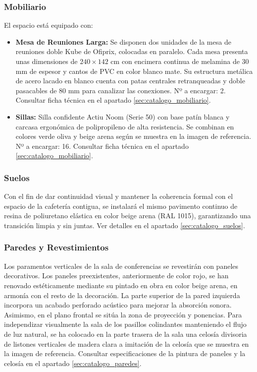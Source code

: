\documentclass[12pt,a4paper]{article}
\begin{document}
\subsubsection{Mobiliario}
El espacio está equipado con:
\begin{itemize}
    \item \textbf{Mesa de Reuniones Larga:} Se disponen dos unidades de la mesa de reuniones doble Kube de Ofiprix, colocadas en paralelo. Cada mesa presenta unas dimensiones de $240 \times 142$ cm con encimera continua de melamina de 30 mm de espesor y cantos de PVC en color blanco mate. Su estructura metálica de acero lacado en blanco cuenta con patas centrales retranqueadas y doble pasacables de 80 mm para canalizar las conexiones. Nº a encargar: 2. Consultar ficha técnica en el apartado \ref{sec:catalogo_mobiliario}.
    \item \textbf{Sillas:} Silla confidente Actiu Noom (Serie 50) con base patín blanca y carcasa ergonómica de polipropileno de alta resistencia. Se combinan en colores verde oliva y beige arena según se muestra en la imagen de referencia. Nº a encargar: 16. Consultar ficha técnica en el apartado \ref{sec:catalogo_mobiliario}.
\end{itemize}

\subsubsection{Suelos}
Con el fin de dar continuidad visual y mantener la coherencia formal con el espacio de la cafetería contigua, se instalará el mismo pavimento continuo de resina de poliuretano elástica en color beige arena (RAL 1015), garantizando una transición limpia y sin juntas. Ver detalles en el apartado \ref{sec:catalogo_suelos}.

\subsubsection{Paredes y Revestimientos}
Los paramentos verticales de la sala de conferencias se revestirán con paneles decorativos. Los paneles preexistentes, anteriormente de color rojo, se han renovado estéticamente mediante su pintado en obra en color beige arena, en armonía con el resto de la decoración. La parte superior de la pared izquierda incorpora un acabado perforado acústico para mejorar la absorción sonora. Asimismo, en el plano frontal se sitúa la zona de proyección y ponencias. Para independizar visualmente la sala de los pasillos colindantes manteniendo el flujo de luz natural, se ha colocado en la parte trasera de la sala una celosía divisoria de listones verticales de madera clara a imitación de la celosía que se muestra en la imagen de referencia. Consultar especificaciones de la pintura de paneles y la celosía en el apartado \ref{sec:catalogo_paredes}.
\end{document}
